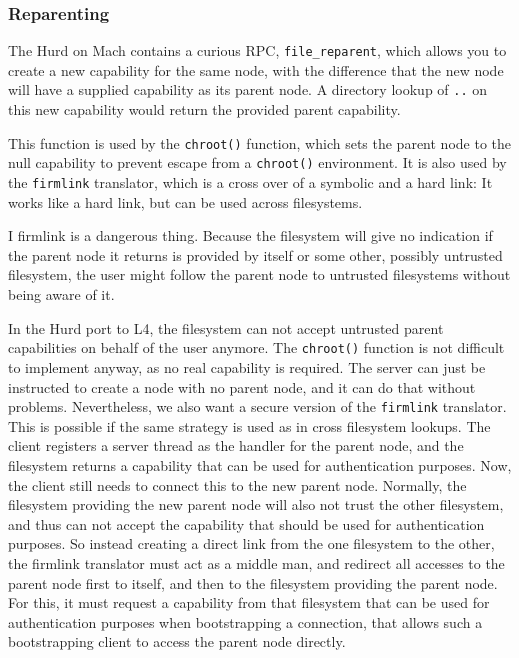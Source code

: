 \documentclass[9pt,a4paper]{extarticle}
\begin{document}
\subsubsection{Reparenting}
\label{reparenting}

The Hurd on Mach contains a curious RPC, \verb/file_reparent/, which
allows you to create a new capability for the same node, with the
difference that the new node will have a supplied capability as its
parent node.  A directory lookup of \texttt{..} on this new capability
would return the provided parent capability.

This function is used by the \texttt{chroot()} function, which sets
the parent node to the null capability to prevent escape from a
\texttt{chroot()} environment.  It is also used by the
\texttt{firmlink} translator, which is a cross over of a symbolic and
a hard link: It works like a hard link, but can be used across
filesystems.

I firmlink is a dangerous thing.  Because the filesystem will give no
indication if the parent node it returns is provided by itself or some
other, possibly untrusted filesystem, the user might follow the parent
node to untrusted filesystems without being aware of it.

In the Hurd port to L4, the filesystem can not accept untrusted parent
capabilities on behalf of the user anymore.  The \texttt{chroot()}
function is not difficult to implement anyway, as no real capability
is required.  The server can just be instructed to create a node with
no parent node, and it can do that without problems.  Nevertheless, we
also want a secure version of the \texttt{firmlink} translator.  This
is possible if the same strategy is used as in cross filesystem
lookups.  The client registers a server thread as the handler for the
parent node, and the filesystem returns a capability that can be used
for authentication purposes.  Now, the client still needs to connect
this to the new parent node.  Normally, the filesystem providing the
new parent node will also not trust the other filesystem, and thus can
not accept the capability that should be used for authentication
purposes.  So instead creating a direct link from the one filesystem
to the other, the firmlink translator must act as a middle man, and
redirect all accesses to the parent node first to itself, and then to
the filesystem providing the parent node.  For this, it must request a
capability from that filesystem that can be used for authentication
purposes when bootstrapping a connection, that allows such a
bootstrapping client to access the parent node directly.
\end{document}
